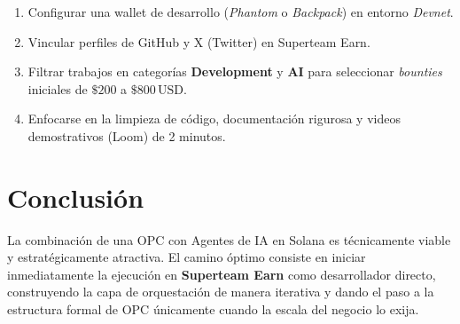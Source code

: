 \documentclass[11pt,a4paper]{article}
\begin{document}
\begin{tcolorbox}[title=Lista de Verificación Inicial]
\begin{enumerate}
    \item Configurar una wallet de desarrollo (\emph{Phantom} o \emph{Backpack}) en entorno \emph{Devnet}.
    \item Vincular perfiles de GitHub y X (Twitter) en Superteam Earn.
    \item Filtrar trabajos en categorías \textbf{Development} y \textbf{AI} para seleccionar \emph{bounties} iniciales de $\$200$ a $\$800\,\text{USD}$.
    \item Enfocarse en la limpieza de código, documentación rigurosa y videos demostrativos (Loom) de 2 minutos.
\end{enumerate}
\end{tcolorbox}

\section{Conclusión}

La combinación de una OPC con Agentes de IA en Solana es técnicamente viable y estratégicamente atractiva. El camino óptimo consiste en iniciar inmediatamente la ejecución en \textbf{Superteam Earn} como desarrollador directo, construyendo la capa de orquestación de manera iterativa y dando el paso a la estructura formal de OPC únicamente cuando la escala del negocio lo exija.
\end{document}

